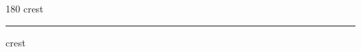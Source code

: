 
\begin{frame}
\begin{center}
\begin{turn}{180}
{\fontsize{2.5cm}{1em}\selectfont crest}
\end{turn}
\vspace{1em}\par  
\hrule
\vspace{1em}\par  
{\fontsize{2.5cm}{1em}\selectfont crest}
\end{center}
\end{frame}
